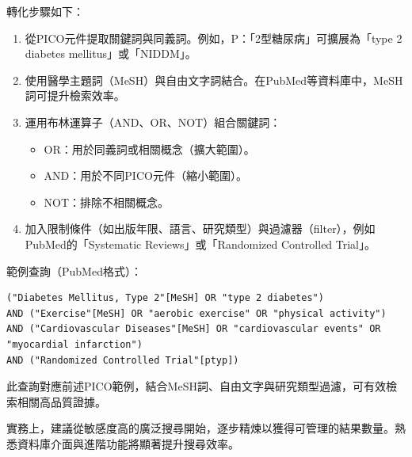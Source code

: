 轉化步驟如下：
\begin{enumerate}
    \item 從PICO元件提取關鍵詞與同義詞。例如，P：「2型糖尿病」可擴展為「type 2 diabetes mellitus」或「NIDDM」。
    \item 使用醫學主題詞（MeSH）與自由文字詞結合。在PubMed等資料庫中，MeSH詞可提升檢索效率。
    \item 運用布林運算子（AND、OR、NOT）組合關鍵詞：
    \begin{itemize}
        \item OR：用於同義詞或相關概念（擴大範圍）。
        \item AND：用於不同PICO元件（縮小範圍）。
        \item NOT：排除不相關概念。
    \end{itemize}
    \item 加入限制條件（如出版年限、語言、研究類型）與過濾器（filter），例如PubMed的「Systematic Reviews」或「Randomized Controlled Trial」。
\end{enumerate}

範例查詢（PubMed格式）：
\begin{verbatim}
("Diabetes Mellitus, Type 2"[MeSH] OR "type 2 diabetes") 
AND ("Exercise"[MeSH] OR "aerobic exercise" OR "physical activity") 
AND ("Cardiovascular Diseases"[MeSH] OR "cardiovascular events" OR "myocardial infarction") 
AND ("Randomized Controlled Trial"[ptyp])
\end{verbatim}

此查詢對應前述PICO範例，結合MeSH詞、自由文字與研究類型過濾，可有效檢索相關高品質證據。

實務上，建議從敏感度高的廣泛搜尋開始，逐步精煉以獲得可管理的結果數量。熟悉資料庫介面與進階功能將顯著提升搜尋效率。

% 

